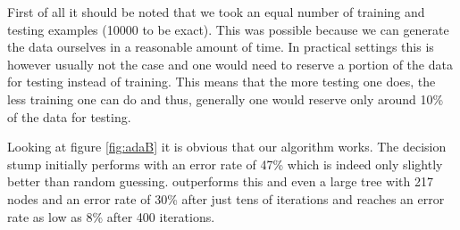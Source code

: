 First of all it should be noted that we took an equal number of training and testing examples (10000 to be exact). This was possible because we can generate the data ourselves in a reasonable amount of time. In practical settings this is however usually not the case and one would need to reserve a portion of the data for testing instead of training. This means that the more testing one does, the less training one can do and thus, generally one would reserve only around 10\% of the data for testing.
\par Looking at figure \ref{fig:adaB} it is obvious that our algorithm works. The decision stump initially performs with an error rate of 47\% which is indeed only slightly better than random guessing. \adaB outperforms this and even a large tree with 217 nodes and an error rate of 30\% after just tens of iterations and reaches an error rate as low as 8\% after 400 iterations. 

 \section{\NHB}
 \label{subsec:NHPracPerf}